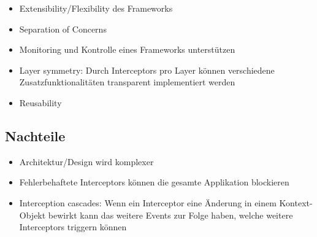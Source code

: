 \begin{itemize}
	\item Extensibility/Flexibility des Frameworks
	\item Separation of Concerns
	\item Monitoring und Kontrolle eines Frameworks unterstützen
	\item Layer symmetry: Durch Interceptors pro Layer können verschiedene Zusatzfunktionalitäten transparent implementiert werden
	\item Reusability
\end{itemize}


\subsection{Nachteile}

\begin{itemize}
	\item Architektur/Design wird komplexer
	\item Fehlerbehaftete Interceptors können die gesamte Applikation blockieren
	\item Interception cascades: Wenn ein Interceptor eine Änderung in einem Kontext-Objekt bewirkt kann das weitere Events zur Folge haben, welche weitere Interceptors triggern können
\end{itemize}
